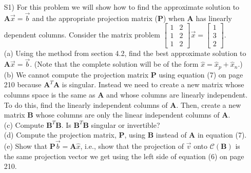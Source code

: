 \documentclass[12pt]{article}
\begin{document}
\begin{itemize}
\item[S1)] For this problem we will show how to find the approximate solution to $\mathbf{A}\vec{x} = \vec{b}$ and the appropriate projection matrix ($\mathbf{P}$) when $\mathbf{A}$ has linearly dependent columns.  Consider the matrix problem $\left[\begin{array}{ccc} 1 & 2\\ 1 & 2\\ 1& 2\end{array}\right]\vec{x} = \left[\begin{array}{c} 1 \\ 3\\ 2\end{array}\right]$.  \\
(a) Using the method from section 4.2, find the best approximate solution to $\mathbf{A}\vec{x} = \vec{b}$.  (Note that the complete solution will be of the form $\hat{x} = \hat{x}_p + \hat{x}_n$.)  \\
(b) We cannot compute the projection matrix $\mathbf{P}$ using equation (7) on page 210 because $\mathbf{A}^T\mathbf{A}$ is singular.  Instead we need to create a new matrix whose columns space is the same as $\mathbf{A}$ and whose columns are linearly independent.  To do this, find the linearly independent columns of $\mathbf{A}$.  Then, create a new matrix $\mathbf{B}$ whose columns are only the linear independent columns of $\mathbf{A}$. \\
(c) Compute $\mathbf{B}^T\mathbf{B}$. Is $\mathbf{B}^T\mathbf{B}$ singular or invertible?\\
(d) Compute the projection matrix, $\mathbf{P}$, using $\mathbf{B}$ instead of $\mathbf{A}$ in equation (7).\\
(e) Show that $\mathbf{P}\vec{b} = \mathbf{A}\hat{x}$, i.e., show that the projection of $\vec{v}$ onto $\mathcal{C}(\mathbf{B})$ is the same projection vector we get using the left side of equation (6) on page 210.  \\


\end{itemize}
\end{document}
